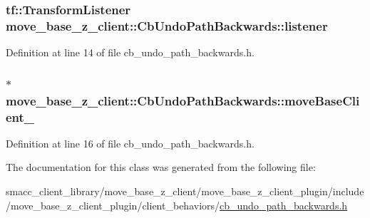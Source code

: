 \subsubsection[{\texorpdfstring{listener}{listener}}]{\setlength{\rightskip}{0pt plus 5cm}tf\+::\+Transform\+Listener move\+\_\+base\+\_\+z\+\_\+client\+::\+Cb\+Undo\+Path\+Backwards\+::listener\hspace{0.3cm}{\ttfamily [private]}}\hypertarget{classmove__base__z__client_1_1CbUndoPathBackwards_a197e2034e873c09de896e7a8b6fe898f}{}\label{classmove__base__z__client_1_1CbUndoPathBackwards_a197e2034e873c09de896e7a8b6fe898f}


Definition at line 14 of file cb\+\_\+undo\+\_\+path\+\_\+backwards.\+h.

\subsubsection[{\texorpdfstring{move\+Base\+Client\+\_\+}{moveBaseClient_}}]{$\ast$ move\+\_\+base\+\_\+z\+\_\+client\+::\+Cb\+Undo\+Path\+Backwards\+::move\+Base\+Client\+\_\+\hspace{0.3cm}{\ttfamily [private]}}\hypertarget{classmove__base__z__client_1_1CbUndoPathBackwards_a19e7ace85698725a1d2730a7c6b3aa7d}{}\label{classmove__base__z__client_1_1CbUndoPathBackwards_a19e7ace85698725a1d2730a7c6b3aa7d}


Definition at line 16 of file cb\+\_\+undo\+\_\+path\+\_\+backwards.\+h.



The documentation for this class was generated from the following file\+:\begin{DoxyCompactItemize}
\item 
smacc\+\_\+client\+\_\+library/move\+\_\+base\+\_\+z\+\_\+client/move\+\_\+base\+\_\+z\+\_\+client\+\_\+plugin/include/move\+\_\+base\+\_\+z\+\_\+client\+\_\+plugin/client\+\_\+behaviors/\hyperlink{cb__undo__path__backwards_8h}{cb\+\_\+undo\+\_\+path\+\_\+backwards.\+h}\end{DoxyCompactItemize}
